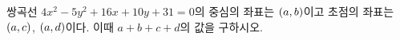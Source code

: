 쌍곡선 $4x^2-5y^2+16x+10y+31=0$의 중심의 좌표는 $(a{,}\mkern3mu\mathopen{}b)$이고 초점의 좌표는 $(a{,}\mkern3mu\mathopen{}c)$, $(a{,}\mkern3mu\mathopen{}d)$이다. 이때 $a+b+c+d$의 값을 구하시오.
